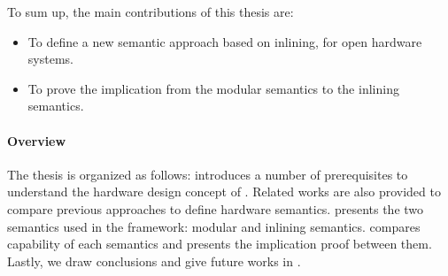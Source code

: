 To sum up, the main contributions of this thesis are:
\begin{itemize}
\item To define a new semantic approach based on inlining, for open
  hardware systems.
\item To prove the implication from the modular semantics to the
  inlining semantics.
\end{itemize}

\paragraph{Overview}

The thesis is organized as follows: 
introduces a number of prerequisites to understand the hardware design
concept of \Bluespec{}. Related works are also provided to compare
previous approaches to define hardware semantics.
 presents the two semantics used in the
\Kami{} framework: modular and inlining
semantics.  compares capability of each
semantics and presents the implication proof between them. Lastly, we
draw conclusions and give future works in .

